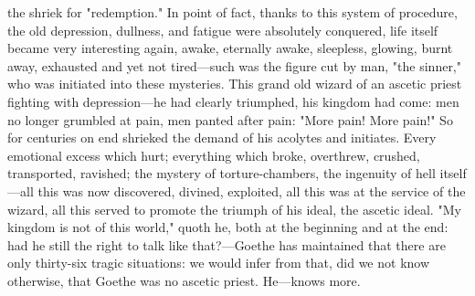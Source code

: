 \documentclass[12pt]{article}
\begin{document}
the shriek for "redemption." In point of fact, thanks to this system of procedure, the old depression, dullness, and fatigue were absolutely conquered, life itself became very interesting again, awake, eternally awake, sleepless, glowing, burnt away, exhausted and yet not tired---such was the figure cut by man, "the sinner," who was initiated into these mysteries. This grand old wizard of an ascetic priest fighting with depression---he had clearly triumphed, his kingdom had come: men no longer grumbled at pain, men panted after pain: "More pain! More pain!" So for centuries on end shrieked the demand of his acolytes and initiates. Every emotional excess which hurt; everything which broke, overthrew, crushed, transported, ravished; the mystery of torture-chambers, the ingenuity of hell itself---all this was now discovered, divined, exploited, all this was at the service of the wizard, all this served to promote the triumph of his ideal, the ascetic ideal. "My kingdom is not of this world," quoth he, both at the beginning and at the end: had he still the right to talk like that?---Goethe has maintained that there are only thirty-six tragic situations: we would infer from that, did we not know otherwise, that Goethe was no ascetic priest. He---knows more.
\end{document}
